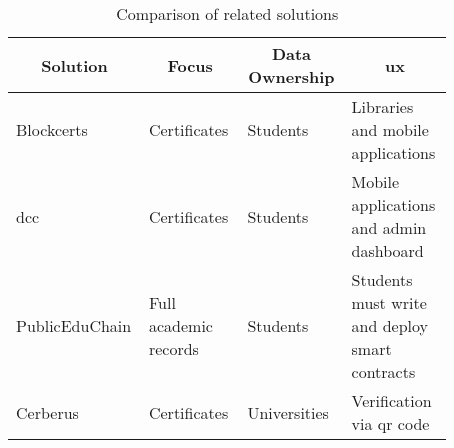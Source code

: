 \begin{table}
\centering
\caption{Comparison of related solutions}
\label{tab:relSolutions}
\begin{tabular}{|p{0.20\linewidth}|p{0.22\linewidth}|p{0.22\linewidth}|p{0.23\linewidth}|}
\hline
\multicolumn{1}{|c|}{\textbf{Solution}} & \multicolumn{1}{c|}{\textbf{Focus}} & \multicolumn{1}{c|}{\textbf{Data Ownership}} & \multicolumn{1}{c|}{\textbf{\gls{ux}}} \\
\hline
Blockcerts & Certificates & Students & Libraries and mobile applications \\
\hline
\acrshort{dcc} & Certificates & Students & Mobile applications and admin dashboard \\
\hline
PublicEduChain & Full academic records & Students & Students must write and deploy smart contracts \\
\hline
Cerberus & Certificates & Universities & Verification via \gls{qr} code \\
\hline
\end{tabular}
\end{table}
